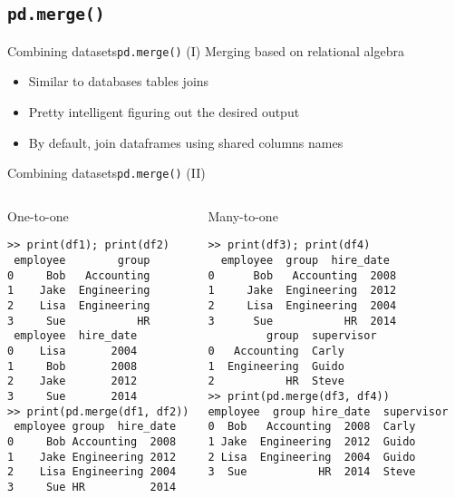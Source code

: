 \documentclass[10pt,compress]{beamer} %
\begin{document}
\subsection{\texttt{pd.merge()}}

\begin{frame}[fragile]{Combining datasets}{\texttt{pd.merge()} (I)}
	Merging based on relational algebra
	\begin{itemize}
		\item Similar to databases tables joins
		\item Pretty intelligent figuring out the desired output
		\item By default, join dataframes using shared columns names
	\end{itemize}
\end{frame}

\begin{frame}[fragile]{Combining datasets}{\texttt{pd.merge()} (II)}
	\scriptsize{
	\begin{columns}
		\begin{exampleblock}{One-to-one}
		\vspace{-0.2cm} 
		\begin{lstlisting}
>> print(df1); print(df2)
 employee        group
0     Bob   Accounting
1    Jake  Engineering
2    Lisa  Engineering
3     Sue           HR
 employee  hire_date
0    Lisa       2004
1     Bob       2008
2    Jake       2012
3     Sue       2014
>> print(pd.merge(df1, df2))
 employee group  hire_date
0     Bob Accounting  2008
1    Jake Engineering 2012
2    Lisa Engineering 2004
3     Sue HR          2014
\end{lstlisting}
		\vspace{-0.2cm} 
		\end{exampleblock}

		\begin{exampleblock}{Many-to-one}
		\vspace{-0.2cm} 
		\begin{lstlisting}
>> print(df3); print(df4)
  employee  group  hire_date
0      Bob   Accounting  2008
1     Jake  Engineering  2012
2     Lisa  Engineering  2004
3      Sue           HR  2014
         group  supervisor
0   Accounting  Carly
1  Engineering  Guido
2           HR  Steve
>> print(pd.merge(df3, df4))
employee  group hire_date  supervisor
0  Bob   Accounting  2008  Carly
1 Jake  Engineering  2012  Guido
2 Lisa  Engineering  2004  Guido
3  Sue           HR  2014  Steve
\end{lstlisting}
		\vspace{-0.2cm} 
		\end{exampleblock}
	\end{columns}
	}
\end{frame}
\end{document}
